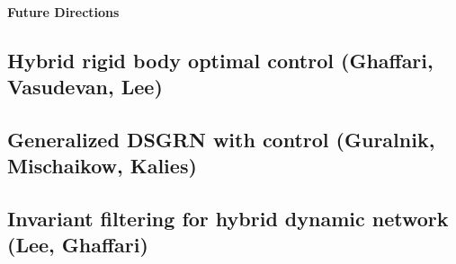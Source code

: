\documentclass[letterpaper,11pt]{article}
\begin{document}
\paragraph*{Future Directions}
\subsection{Hybrid rigid body optimal control (Ghaffari, Vasudevan, Lee)}
\subsection{Generalized DSGRN with control (Guralnik, Mischaikow, Kalies)}
\subsection{Invariant filtering for hybrid dynamic network (Lee, Ghaffari)}
\end{document}
